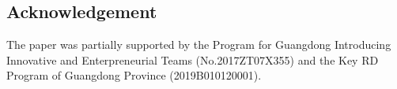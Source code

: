 \documentclass[11pt,a4paper]{article}
\begin{document}
\begin{spacing}{1.0}
\section{Acknowledgement}
The paper was partially supported by the Program for Guangdong Introducing Innovative and Enterpreneurial Teams (No.2017ZT07X355) and the Key RD Program of Guangdong Province (2019B010120001).

\end{spacing}
\newpage


\end{document}
